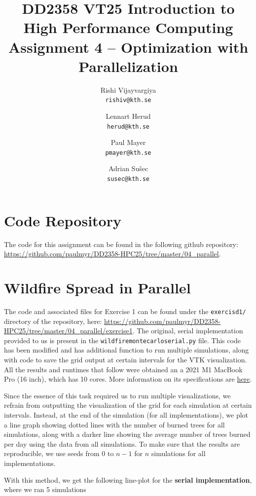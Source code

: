 \documentclass[a4paper,12pt]{article}
\title{
  \normalsize{DD2358 VT25 Introduction to}\\
  \normalsize{High Performance Computing}\\
  \large{Assignment 4 -- Optimization with Parallelization}\\
}
\author{
  \small Rishi Vijayvargiya\\[-0.75ex]
  \scriptsize\texttt{rishiv@kth.se}
  \and
  \small Lennart Herud\\[-0.75ex]
  \scriptsize\texttt{herud@kth.se}
  \and
  \small Paul Mayer\\[-0.75ex]
  \scriptsize\texttt{pmayer@kth.se}
  \and
  \small Adrian Sušec\\[-0.75ex]
  \scriptsize\texttt{susec@kth.se}
}
\date{}
\begin{document}
\maketitle
\thispagestyle{firstpagestyle}
\listoftodos

\tableofcontents
\vspace{1em}

%

\section*{Code Repository}
The code for this assignment can be found in the following github repository: \url{https://github.com/paulmyr/DD2358-HPC25/tree/master/04_parallel}.

\section{Wildfire Spread in Parallel}
The code and associated files for Exercise 1 can be found under the \verb|exercisd1/| directory of the repository, here: \url{https://github.com/paulmyr/DD2358-HPC25/tree/master/04_parallel/exercise1}. The original, serial implementation provided to us is present in the \verb|wildfiremontecarloserial.py| file. This code has been modified and has additional function to run multiple simulations, along with code to save the grid output at certain intervals for the VTK visualization. All the results and runtimes that follow were obtained an a 2021 M1 MacBook Pro (16 inch), which has 10 cores. More information on its specifications are \href{https://support.apple.com/en-us/111901}{here}.

Since the essence of this task required us to run multiple visualizations, we refrain from outputting the visualization of the grid for each simulation at certain intervals. Instead, at the end of the simulation (for all implementations), we plot a line graph showing dotted lines with the number of burned trees for all simulations, along with a darker line showing the average number of trees burned per day using the data from all simulations. To make sure that the results are reproducible, we use seeds from 0 to $n-1$ for $n$ simulations for all implementations. 

With this method, we get the following line-plot for the \textbf{serial implementation}, where we ran 5 simulations
\end{document}
